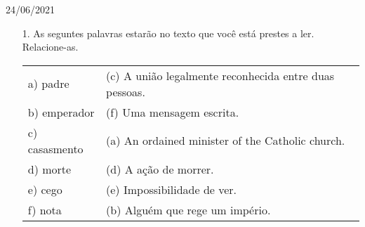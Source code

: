 \documentclass{SchoolBook}
\begin{document}
\begin{day}{24/06/2021}
\begin{enumerate}
            \item[1.] As seguntes palavras estarão no texto que você está prestes a ler. Relacione-as.
            
            \begin{tabular}{l l}
                a) padre      & (c) A união legalmente reconhecida entre duas pessoas. \\
                b) emperador  & (f) Uma mensagem escrita.                              \\
                c) casasmento & (a) An ordained minister of the Catholic church.       \\
                d) morte      & (d) A ação de morrer.                                  \\
                e) cego       & (e) Impossibilidade de ver.                            \\
                f) nota       & (b) Alguém que rege um império.
            \end{tabular}
        \end{enumerate}
    \end{day}
    
\end{document}
